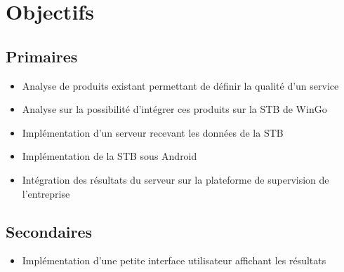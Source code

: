 
\chapter{Objectifs}

\section{Primaires}
\begin{itemize}
	\item Analyse de produits existant permettant de définir la qualité d'un service
	\item Analyse sur la possibilité d'intégrer ces produits sur la STB de WinGo
	\item Implémentation d'un serveur recevant les données de la STB
	\item Implémentation de la STB sous Android
	\item Intégration des résultats du serveur sur la plateforme de supervision de l'entreprise
\end{itemize}

\section{Secondaires}
\begin{itemize}
	\item Implémentation d'une petite interface utilisateur affichant les résultats
\end{itemize}






